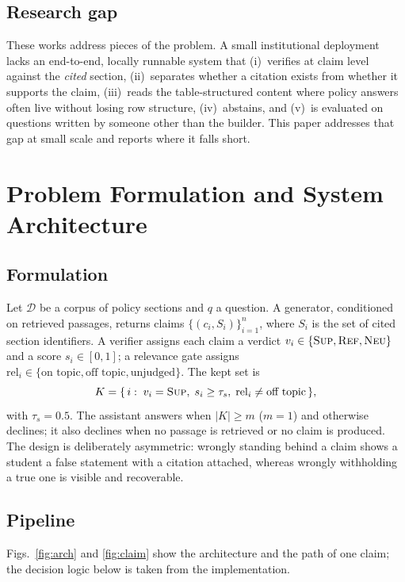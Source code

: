 \documentclass[conference]{IEEEtran}
\newcommand{\SUP}{\textsc{Sup}}
\newcommand{\REF}{\textsc{Ref}}
\newcommand{\NEU}{\textsc{Neu}}
\begin{document}
\subsection{Research gap}
These works address pieces of the problem. A small institutional deployment lacks an end-to-end, locally
runnable system that (i)~verifies at claim level against the \emph{cited} section, (ii)~separates whether a
citation exists from whether it supports the claim, (iii)~reads the table-structured content where policy
answers often live without losing row structure, (iv)~abstains, and (v)~is evaluated on questions written
by someone other than the builder. This paper addresses that gap at small scale and reports where it falls
short.

\section{Problem Formulation and System Architecture}\label{sec:system}
\subsection{Formulation}
Let $\mathcal{D}$ be a corpus of policy sections and $q$ a question. A generator, conditioned on retrieved
passages, returns claims $\{(c_i,S_i)\}_{i=1}^{n}$, where $S_i$ is the set of cited section identifiers. A
verifier assigns each claim a verdict $v_i\in\{\SUP,\REF,\NEU\}$ and a score $s_i\in[0,1]$; a relevance
gate assigns $\mathrm{rel}_i\in\{\text{on topic},\text{off topic},\text{unjudged}\}$. The kept set is
\begin{equation}
K=\{\,i:\; v_i=\SUP,\; s_i\ge\tau_s,\; \mathrm{rel}_i\neq\text{off topic}\,\},\label{eq:kept}
\end{equation}
with $\tau_s=0.5$. The assistant answers when $|K|\ge m$ ($m=1$) and otherwise declines; it also declines
when no passage is retrieved or no claim is produced. The design is deliberately asymmetric: wrongly
standing behind a claim shows a student a false statement with a citation attached, whereas wrongly
withholding a true one is visible and recoverable.

\subsection{Pipeline}
Figs.~\ref{fig:arch} and \ref{fig:claim} show the architecture and the path of one claim; the decision
logic below is taken from the implementation.
\end{document}

